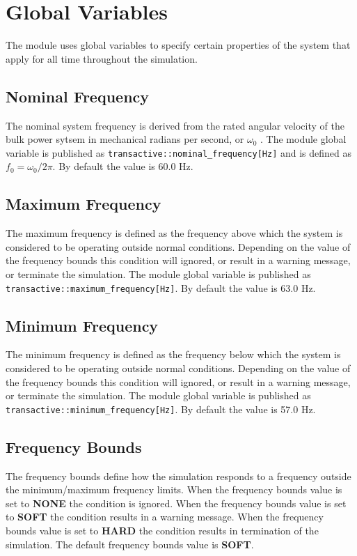 \chapter{Global Variables}

The module uses global variables to specify certain properties of the system that apply for all time throughout the simulation.

\section{Nominal Frequency}

The nominal system frequency is derived from the rated angular velocity of the bulk power sytsem in mechanical radians per second, or $\omega_0$ \cite{kundur1994}. The module global variable is published as \texttt{transactive::nominal\_frequency[Hz]} and is defined as $f_0 = \omega_0/2\pi$. By default the value is 60.0 Hz.

\section{Maximum Frequency}

The maximum frequency is defined as the frequency above which the system is considered to be operating outside normal conditions.  Depending on the value of the frequency bounds this condition will ignored, or result in a warning message, or terminate the simulation. The module global variable is published as \texttt{transactive::maximum\_frequency[Hz]}. By default the value is 63.0 Hz.

\section{Minimum Frequency}

The minimum frequency is defined as the frequency below which the system is considered to be operating outside normal conditions.  Depending on the value of the frequency bounds this condition will ignored, or result in a warning message, or terminate the simulation. The module global variable is published as \texttt{transactive::minimum\_frequency[Hz]}. By default the value is 57.0 Hz.

\section{Frequency Bounds}

The frequency bounds define how the simulation responds to a frequency outside the minimum/maximum frequency limits.  When the frequency bounds value is set to \textbf{NONE} the condition is ignored.  When the frequency bounds value is set to \textbf{SOFT} the condition results in a warning message. When the frequency bounds value is set to \textbf{HARD} the condition results in termination of the simulation. The default frequency bounds value is \textbf{SOFT}.

